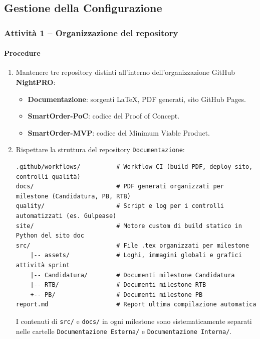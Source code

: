 \documentclass[a4paper, 11pt, oneside]{scrartcl}
\begin{document}
\subsection{Gestione della Configurazione}

\subsubsection{Attività 1 – Organizzazione del repository}

\paragraph{Procedure}
\begin{enumerate}
    \item Mantenere tre repository distinti all'interno dell'organizzazione GitHub \textbf{NightPRO}:
          \begin{itemize}
              \item \textbf{Documentazione}: sorgenti \LaTeX{}, PDF generati, sito GitHub Pages.
              \item \textbf{SmartOrder-PoC}: codice del Proof of Concept.
              \item \textbf{SmartOrder-MVP}: codice del Minimum Viable Product.
          \end{itemize}
    \item Rispettare la struttura del repository \texttt{Documentazione}:
          \begin{verbatim}
.github/workflows/          # Workflow CI (build PDF, deploy sito, controlli qualità)
docs/                       # PDF generati organizzati per milestone (Candidatura, PB, RTB)
quality/                    # Script e log per i controlli automatizzati (es. Gulpease)
site/                       # Motore custom di build statico in Python del sito doc
src/                        # File .tex organizzati per milestone
    |-- assets/             # Loghi, immagini globali e grafici attività sprint
    |-- Candidatura/        # Documenti milestone Candidatura
    |-- RTB/                # Documenti milestone RTB
    +-- PB/                 # Documenti milestone PB
report.md                   # Report ultima compilazione automatica
\end{verbatim}
          I contenuti di \texttt{src/} e \texttt{docs/} in ogni milestone sono sistematicamente separati nelle cartelle \texttt{Documentazione Esterna/} e \texttt{Documentazione Interna/}.

\end{enumerate}
\end{document}
